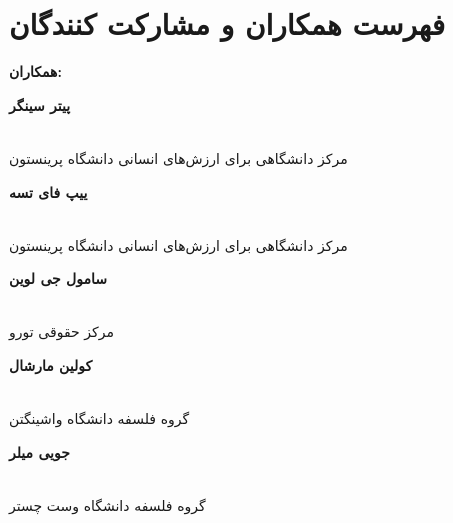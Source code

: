 
{
\section*{فهرست همکاران و مشارکت کنندگان}
\label{sec:فهرست همکاران و مشارکت کنندگان}
}

\begin{multicols}{2} %
    \begin{flushright}
        \begin{Large}
            \textbf{همکاران:}
        \end{Large}
    \end{flushright}

    \begin{flushright}
        \begin{normalsize}
            \textbf{پیتر سینگر}
        \end{normalsize}
        \\
        مرکز دانشگاهی برای ارزش‌های انسانی دانشگاه پرینستون
    \end{flushright}

    \begin{flushright}
        \begin{normalsize}
            \textbf{ییپ فای تسه}
        \end{normalsize}
        \\
        مرکز دانشگاهی برای ارزش‌های انسانی دانشگاه پرینستون
    \end{flushright}

    \begin{flushright}
        \begin{normalsize}
            \textbf{سامول جی لوین}
        \end{normalsize}
        \\
        مرکز حقوقی تورو
    \end{flushright}

    \begin{flushright}
        \begin{normalsize}
            \textbf{کولین مارشال}
        \end{normalsize}
        \\
        گروه فلسفه دانشگاه واشینگتن
    \end{flushright}

    \begin{flushright}
        \begin{normalsize}
            \textbf{جویی میلر}
        \end{normalsize}
        \\
        گروه فلسفه دانشگاه وست چستر
    \end{flushright}


\end{multicols}
